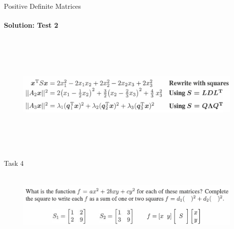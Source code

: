 \documentclass[aspectratio=169]{beamer}
\begin{document}
        \begin{frame}[t]{Positive Definite Matrices}
            \framesubtitle{Solution: Test 2}
            \begin{figure}[H]
                \centering\includegraphics[height=6cm,width=1\textwidth,keepaspectratio]{pos_def_ex1_ans3.png}
                \label{fig:pos_def_ex1_ans3.png}
            \end{figure}
            \end{frame}

\begin{frame}[t]{Task 4}
    \framesubtitle{}
    \vspace{-0.5cm}
    \begin{figure}[H]
        \centering\includegraphics[height=3cm,width=1\textwidth,keepaspectratio]{4.png}
        \label{fig:4.png}
    \end{figure}
\end{frame}
\end{document}
